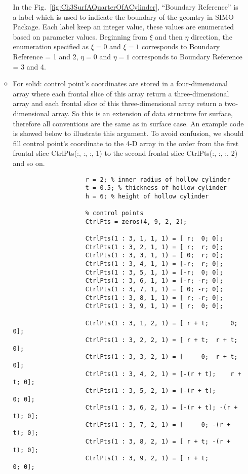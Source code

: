 \begin{itemize}
\begin{itemize}
            In the Fig.~\ref{fig:Ch3SurfAQuarterOfACylinder}, ``Boundary Reference'' is a label which is used to indicate the boundary of the geomtry in SIMO Package. Each label keep an integer value, these values are enumerated based on parameter values. Beginning from $\xi$ and then $\eta$ direction, the enumeration specified as $\xi = 0$ and $\xi = 1$ corresponds to Boundary Reference = 1 and 2, $\eta = 0$ and $\eta = 1$ corresponds to Boundary Reference = 3 and 4.
            \item For solid: control point's coordinates are stored in a four-dimensional array where each frontal slice of this array return a three-dimensional array and each frontal slice of this three-dimensional array return a two-dimensional array. So this is an extension of data structure for surface, therefore all conventions are the same as in surface case. An example code is showed below to illustrate this argument.  To avoid confusion, we should fill control point's coordinate to the 4-D array in the order from the first frontal slice {\selectfont \ttfamily CtrlPts(:, :, :, 1)} to the second frontal slice {\selectfont \ttfamily CtrlPts(:, :, :, 2)} and so on.
                \begin{lstlisting}
                    r = 2; % inner radius of hollow cylinder
                    t = 0.5; % thickness of hollow cylinder
                    h = 6; % height of hollow cylinder

                    % control points
                    CtrlPts = zeros(4, 9, 2, 2);

                    CtrlPts(1 : 3, 1, 1, 1) = [ r;  0; 0];
                    CtrlPts(1 : 3, 2, 1, 1) = [ r;  r; 0];
                    CtrlPts(1 : 3, 3, 1, 1) = [ 0;  r; 0];
                    CtrlPts(1 : 3, 4, 1, 1) = [-r;  r; 0];
                    CtrlPts(1 : 3, 5, 1, 1) = [-r;  0; 0];
                    CtrlPts(1 : 3, 6, 1, 1) = [-r; -r; 0];
                    CtrlPts(1 : 3, 7, 1, 1) = [ 0; -r; 0];
                    CtrlPts(1 : 3, 8, 1, 1) = [ r; -r; 0];
                    CtrlPts(1 : 3, 9, 1, 1) = [ r;  0; 0];

                    CtrlPts(1 : 3, 1, 2, 1) = [ r + t;      0; 0];
                    CtrlPts(1 : 3, 2, 2, 1) = [ r + t;  r + t; 0];
                    CtrlPts(1 : 3, 3, 2, 1) = [     0;  r + t; 0];
                    CtrlPts(1 : 3, 4, 2, 1) = [-(r + t);    r + t; 0];
                    CtrlPts(1 : 3, 5, 2, 1) = [-(r + t);        0; 0];
                    CtrlPts(1 : 3, 6, 2, 1) = [-(r + t); -(r + t); 0];
                    CtrlPts(1 : 3, 7, 2, 1) = [     0; -(r + t); 0];
                    CtrlPts(1 : 3, 8, 2, 1) = [ r + t; -(r + t); 0];
                    CtrlPts(1 : 3, 9, 2, 1) = [ r + t;        0; 0];


\end{lstlisting}
\end{itemize}
\end{itemize}
